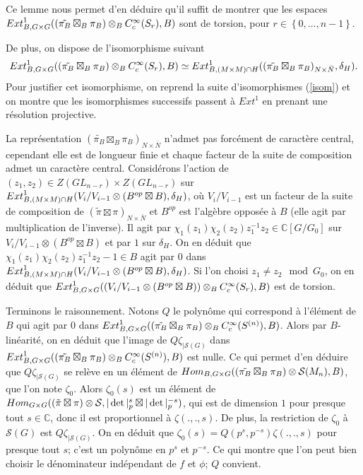 Ce lemme nous permet d'en déduire qu'il suffit de montrer que les espaces $\operatorname{\mathnormal{Ext}}^1_{B, G \times G}((\tilde{\pi_B} \boxtimes_B \pi_B) \otimes_B C^\infty_c(S_r), B)$ sont de torsion, pour $r \in \left\lbrace 0, ..., n-1 \right\rbrace$.

De plus, on dispose de l'isomorphisme suivant
\begin{equation}
\operatorname{\mathnormal{Ext}}^1_{B, G \times G}((\tilde{\pi_B} \boxtimes_B \pi_B) \otimes_B C^\infty_c(S_r), B) \simeq \operatorname{\mathnormal{Ext}}^1_{B, (M \times M) \cap H}((\tilde{\pi_B} \boxtimes_B \pi_B)_{N \times \bar{N}}, \delta_H).
\end{equation}
Pour justifier cet isomorphisme, on reprend la suite d'isomorphismes (\ref{isom}) et on montre que les isomorphismes successifs passent à $Ext^1$ en prenant une résolution projective.

La représentation $(\tilde{\pi_B} \boxtimes_B \pi_B)_{N \times \bar{N}}$ n'admet pas forcément de caractère central, cependant elle est de longueur finie et chaque facteur de la suite de composition admet un caractère central. Considérons l'action de $(z_1,z_2) \in Z(GL_{n-r}) \times Z(GL_{n-r})$ sur $\operatorname{\mathnormal{Ext}}^1_{B, (M \times M) \cap H}(V_i/V_{i-1} \otimes (B^{op} \boxtimes B), \delta_H)$, où $V_{i}/V_{i-1}$ est un facteur de la suite de composition de $(\tilde{\pi} \boxtimes \pi)_{N \times \bar{N}}$ et $B^{op}$ est l'algèbre opposée à $B$ (elle agit par multiplication de l'inverse). Il agit par $\chi_1(z_1)\chi_2(z_2)z_1^{-1}z_2 \in \mathbb{C}[G/G_0]$ sur $V_i/V_{i-1} \otimes (B^{op} \boxtimes B)$ et par $1$ sur $\delta_H$. On en déduit que $\chi_1(z_1)\chi_2(z_2)z_1^{-1}z_2-1 \in B$ agit par $0$ dans $\operatorname{\mathnormal{Ext}}^1_{B, (M \times M) \cap H}(V_i/V_{i-1} \otimes (B^{op} \boxtimes B), \delta_H)$. Si l'on choisi $z_1 \neq z_2 \mod G_0$, on en déduit que $\operatorname{\mathnormal{Ext}}^1_{B, G \times G}((V_i/V_{i-1} \otimes (B^{op} \boxtimes B)) \otimes_B C^\infty_c(S_r), B)$ est de torsion.

Terminons le raisonnement. Notons $Q$ le polynôme qui correspond à l'élément de $B$ qui agit par $0$ dans $\operatorname{\mathnormal{Ext}}^1_{B, G \times G}((\tilde{\pi_B} \boxtimes_B \pi_B) \otimes_B C^\infty_c(S^{(n)}), B)$. Alors par $B$-linéarité, on en déduit que l'image de $Q\zeta_{|\mathcal{S}(G)}$ dans $\operatorname{\mathnormal{Ext}}^1_{B, G \times G}((\tilde{\pi_B} \boxtimes_B \pi_B) \otimes_B C^\infty_c(S^{(n)}), B)$ est nulle. Ce qui permet d'en déduire que $Q\zeta_{|\mathcal{S}(G)}$ se relève en un élément de $\operatorname{\mathnormal{Hom}}_{B, G \times G}((\tilde{\pi_B} \boxtimes_B \pi_B) \otimes \mathcal{S}(M_n), B)$, que l'on note $\zeta_0$. Alors $\zeta_0(s)$ est un élément de $\operatorname{\mathnormal{Hom}}_{G \times G} ( (\tilde{\pi} \boxtimes \pi) \otimes \mathcal{S}, |\det|_p^s \boxtimes |\det|_p^{-s})$, qui est de dimension $1$ pour presque tout $s \in \mathbb{C}$, donc il est proportionnel à $\zeta(., ., s)$. De plus, la restriction de $\zeta_0$ à $\mathcal{S}(G)$ est $Q\zeta_{|\mathcal{S}(G)}$. On en déduit que $\zeta_0(s) = Q(p^s, p^{-s})\zeta(.,.,s)$ pour presque tout $s$; c'est un polynôme en $p^s$ et $p^{-s}$. Ce qui montre que l'on peut bien choisir le dénominateur indépendant de $f$ et $\phi$; $Q$ convient.